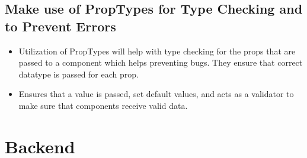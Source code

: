\documentclass{article}
\begin{document}
\subsection{Make use of PropTypes for Type Checking and to Prevent Errors}
\begin{itemize}
    \item Utilization of PropTypes will help with type checking for the props that are passed to a component which helps preventing bugs. They ensure that correct datatype is passed for each prop.
    \item Ensures that a value is passed, set default values, and acts as a validator to make sure that components receive valid data.
\end{itemize}

\section{Backend}
\end{document}
